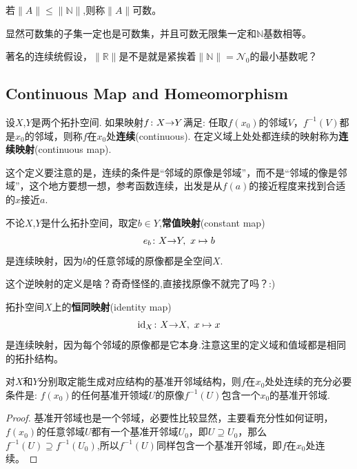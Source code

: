 \begin{definition}
若$\|A\| \leqslant \|\mathbb{N}\|$,则称$\|A\|$可数。 
\end{definition}

显然可数集的子集一定也是可数集，并且可数无限集一定和$\mathbb{N}$基数相等。

著名的连续统假设，$\|\mathbb{R}\|$是不是就是紧挨着$\|\mathbb{N}\|=\mathcal{N}_0$的最小基数呢？
\newpage
\subsection{Continuous Map and Homeomorphism}

\begin{definition}
设$X$,$Y$是两个拓扑空间. 如果映射${f}\colon{X}{\to}{Y}$满足: 任取$f(x_0)$的邻域$V$，$f^{-1}(V)$都是$x_0$的邻域，则称$f$在$x_0$处\textbf{连续}(continuous). 在定义域上处处都连续的映射称为\textbf{连续映射}(continuous map).
\end{definition}

这个定义要注意的是，连续的条件是“邻域的原像是邻域”，而不是“邻域的像是邻域”，这个地方要想一想，参考函数连续，出发是从$f(a)$的接近程度来找到合适的$x$接近$a$.

\begin{example}
不论$X$,$Y$是什么拓扑空间，取定$b \in Y$,\textbf{常值映射}(constant map)\[{e_b}\colon{X}{\to}{Y},\ x \mapsto b\]是连续映射，因为$b$的任意邻域的原像都是全空间$X$.
\end{example}

这个逆映射的定义是啥？奇奇怪怪的,直接找原像不就完了吗？:)

\begin{example}
拓扑空间$X$上的\textbf{恒同映射}(identity map)\[{\text{id}_{X}}\colon{X}{\to}{X},\ x\mapsto x\]是连续映射，因为每个邻域的原像都是它本身.注意这里的定义域和值域都是相同的拓扑结构。
\end{example}

\begin{proposition}
对$X$和$Y$分别取定能生成对应结构的基准开邻域结构，则$f$在$x_0$处处连续的充分必要条件是: $f(x_0)$的任何基准开领域$U$的原像$f^{-1}(U)$包含一个$x_0$的基准开邻域.
\end{proposition}

\begin{proof}
基准开邻域也是一个邻域，必要性比较显然，主要看充分性如何证明，$f(x_0)$的任意邻域$U$都有一个基准开邻域$U_0$，即$U \supseteq U_0$，那么$f^{-1}(U) \supseteq f^{-1}(U_0)$,所以$f^{-1}(U)$同样包含一个基准开邻域，即$f$在$x_0$处连续。
\end{proof}

